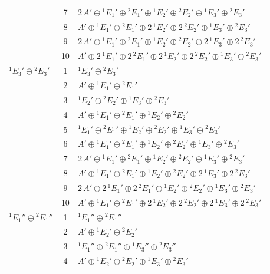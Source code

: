 \documentclass[11pt]{article}
\begin{document}
\begin{longtable}{l c p{}}
 & 7 & $2\,A'\oplus {}^{1}E_{1}'\oplus {}^{2}E_{1}'\oplus {}^{1}E_{2}'\oplus {}^{2}E_{2}'\oplus {}^{1}E_{3}'\oplus {}^{2}E_{3}'$\\
 & 8 & $A'\oplus {}^{1}E_{1}'\oplus {}^{2}E_{1}'\oplus 2\,{}^{1}E_{2}'\oplus 2\,{}^{2}E_{2}'\oplus {}^{1}E_{3}'\oplus {}^{2}E_{3}'$\\
 & 9 & $2\,A'\oplus {}^{1}E_{1}'\oplus {}^{2}E_{1}'\oplus {}^{1}E_{2}'\oplus {}^{2}E_{2}'\oplus 2\,{}^{1}E_{3}'\oplus 2\,{}^{2}E_{3}'$\\
 & 10 & $A'\oplus 2\,{}^{1}E_{1}'\oplus 2\,{}^{2}E_{1}'\oplus 2\,{}^{1}E_{2}'\oplus 2\,{}^{2}E_{2}'\oplus {}^{1}E_{3}'\oplus {}^{2}E_{3}'$\\
\hline
${}^{1}E_{3}'\oplus {}^{2}E_{3}'$ & 1 & ${}^{1}E_{3}'\oplus {}^{2}E_{3}'$\\
 & 2 & $A'\oplus {}^{1}E_{1}'\oplus {}^{2}E_{1}'$\\
 & 3 & ${}^{1}E_{2}'\oplus {}^{2}E_{2}'\oplus {}^{1}E_{3}'\oplus {}^{2}E_{3}'$\\
 & 4 & $A'\oplus {}^{1}E_{1}'\oplus {}^{2}E_{1}'\oplus {}^{1}E_{2}'\oplus {}^{2}E_{2}'$\\
 & 5 & ${}^{1}E_{1}'\oplus {}^{2}E_{1}'\oplus {}^{1}E_{2}'\oplus {}^{2}E_{2}'\oplus {}^{1}E_{3}'\oplus {}^{2}E_{3}'$\\
 & 6 & $A'\oplus {}^{1}E_{1}'\oplus {}^{2}E_{1}'\oplus {}^{1}E_{2}'\oplus {}^{2}E_{2}'\oplus {}^{1}E_{3}'\oplus {}^{2}E_{3}'$\\
 & 7 & $2\,A'\oplus {}^{1}E_{1}'\oplus {}^{2}E_{1}'\oplus {}^{1}E_{2}'\oplus {}^{2}E_{2}'\oplus {}^{1}E_{3}'\oplus {}^{2}E_{3}'$\\
 & 8 & $A'\oplus {}^{1}E_{1}'\oplus {}^{2}E_{1}'\oplus {}^{1}E_{2}'\oplus {}^{2}E_{2}'\oplus 2\,{}^{1}E_{3}'\oplus 2\,{}^{2}E_{3}'$\\
 & 9 & $2\,A'\oplus 2\,{}^{1}E_{1}'\oplus 2\,{}^{2}E_{1}'\oplus {}^{1}E_{2}'\oplus {}^{2}E_{2}'\oplus {}^{1}E_{3}'\oplus {}^{2}E_{3}'$\\
 & 10 & $A'\oplus {}^{1}E_{1}'\oplus {}^{2}E_{1}'\oplus 2\,{}^{1}E_{2}'\oplus 2\,{}^{2}E_{2}'\oplus 2\,{}^{1}E_{3}'\oplus 2\,{}^{2}E_{3}'$\\
\hline
${}^{1}E_{1}''\oplus {}^{2}E_{1}''$ & 1 & ${}^{1}E_{1}''\oplus {}^{2}E_{1}''$\\
 & 2 & $A'\oplus {}^{1}E_{2}'\oplus {}^{2}E_{2}'$\\
 & 3 & ${}^{1}E_{1}''\oplus {}^{2}E_{1}''\oplus {}^{1}E_{3}''\oplus {}^{2}E_{3}''$\\
 & 4 & $A'\oplus {}^{1}E_{2}'\oplus {}^{2}E_{2}'\oplus {}^{1}E_{3}'\oplus {}^{2}E_{3}'$\\

\end{longtable}
\end{document}
